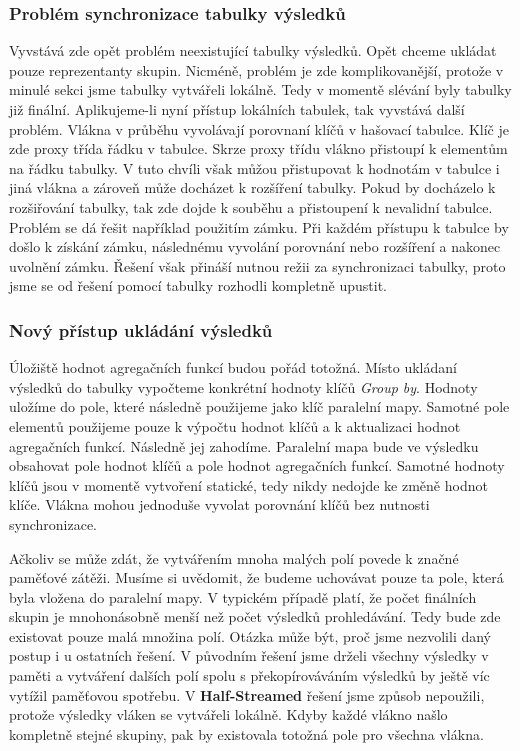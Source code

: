 \subsubsection{Problém synchronizace tabulky výsledků}

Vyvstává zde opět problém neexistující tabulky výsledků.
Opět chceme ukládat pouze reprezentanty skupin.
Nicméně, problém je zde komplikovanější, protože v minulé sekci jsme tabulky vytvářeli lokálně.
Tedy v momentě slévání byly tabulky již finální. 
Aplikujeme-li nyní přístup lokálních tabulek, tak vyvstává další problém.
Vlákna v průběhu vyvolávají porovnaní klíčů v hašovací tabulce.
Klíč je zde proxy třída řádku v tabulce.
Skrze proxy třídu vlákno přistoupí k elementům na řádku tabulky.
V tuto chvíli však můžou přistupovat k hodnotám v tabulce i jiná vlákna a zároveň může docházet k rozšíření tabulky.
Pokud by docházelo k rozšiřování tabulky, tak zde dojde k souběhu a přistoupení k nevalidní tabulce.
Problém se dá řešit například použitím zámku.
Při každém přístupu k tabulce by došlo k získání zámku, následnému vyvolání porovnání nebo rozšíření a nakonec uvolnění zámku.
Řešení však přináší nutnou režii za synchronizaci tabulky, proto jsme se od řešení pomocí tabulky rozhodli kompletně upustit.

\subsubsection{Nový přístup ukládání výsledků}

Úložiště hodnot agregačních funkcí budou pořád totožná.
Místo ukládaní výsledků do tabulky vypočteme konkrétní hodnoty klíčů \textit{Group by}.
Hodnoty uložíme do pole, které následně použijeme jako klíč paralelní mapy.  
Samotné pole elementů použijeme pouze k výpočtu hodnot klíčů a k aktualizaci hodnot agregačních funkcí.
Následně jej zahodíme.
Paralelní mapa bude ve výsledku obsahovat pole hodnot klíčů a pole hodnot agregačních funkcí.
Samotné hodnoty klíčů jsou v momentě vytvoření statické, tedy nikdy nedojde ke změně hodnot klíče.
Vlákna mohou jednoduše vyvolat porovnání klíčů bez nutnosti synchronizace.

Ačkoliv se může zdát, že vytvářením mnoha malých polí povede k značné paměťové zátěži.
Musíme si uvědomit, že budeme uchovávat pouze ta pole, která byla vložena do paralelní mapy.
V typickém případě platí, že počet finálních skupin je mnohonásobně menší než počet výsledků prohledávání.
Tedy bude zde existovat pouze malá množina polí.
Otázka může být, proč jsme nezvolili daný postup i u ostatních řešení.
V původním řešení jsme drželi všechny výsledky v paměti a vytváření dalších polí spolu s překopírováváním výsledků by ještě víc vytížil paměťovou spotřebu.
V \textbf{Half-Streamed} řešení jsme způsob nepoužili, protože výsledky vláken se vytvářeli lokálně.
Kdyby každé vlákno našlo kompletně stejné skupiny, pak by existovala totožná pole pro všechna vlákna.

